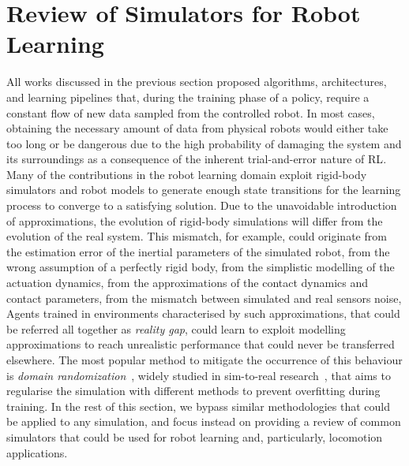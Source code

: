 \section{Review of Simulators for Robot Learning}
\label{sec:review_simulators_robot_learning}

All works discussed in the previous section proposed algorithms, architectures, and learning pipelines that, during the training phase of a policy, require a constant flow of new data sampled from the controlled robot.
In most cases, obtaining the necessary amount of data from physical robots would either take too long or be dangerous due to the high probability of damaging the system and its surroundings as a consequence of the inherent trial-and-error nature of \ac{RL}.
Many of the contributions in the robot learning domain exploit rigid-body simulators and robot models to generate enough state transitions for the learning process to converge to a satisfying solution.
Due to the unavoidable introduction of approximations, the evolution of rigid-body simulations will differ from the evolution of the real system.
This mismatch, for example, could originate from the estimation error of the inertial parameters of the simulated robot, from the wrong assumption of a perfectly rigid body, from the simplistic modelling of the actuation dynamics, from the approximations of the contact dynamics and contact parameters, from the mismatch between simulated and real sensors noise, \etc
Agents trained in environments characterised by such approximations, that could be referred all together as \emph{reality gap}, could learn to exploit modelling approximations to reach unrealistic performance that could never be transferred elsewhere.
The most popular method to mitigate the occurrence of this behaviour is \emph{domain randomization}~\parencite{peng_sim--real_2018, muratore_robot_2022}, widely studied in sim-to-real research~\parencite{zhao_sim--real_2020}, that aims to regularise the simulation with different methods to prevent overfitting during training.
In the rest of this section, we bypass similar methodologies that could be applied to any simulation, and focus instead on providing a review of common simulators that could be used for robot learning and, particularly, locomotion applications.

